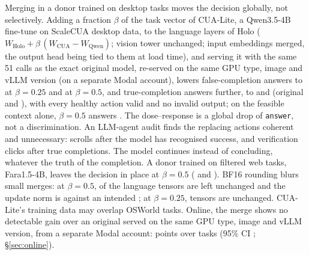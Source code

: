Merging in a donor trained on desktop tasks moves the decision globally, not selectively. Adding a fraction $\beta$ of the task vector \citep{ilharco2023task} of CUA-Lite, a Qwen3.5-4B fine-tune on ScaleCUA desktop data, to the language layers of Holo ($W_{\text{Holo}}+\beta\,(W_{\text{CUA}}-W_{\text{Qwen}})$; vision tower unchanged; input embeddings merged, the output head being tied to them at load time), and serving it with the same 51 calls as the exact original model, re-served on the same GPU type, image and vLLM version (on a separate Modal account), lowers false-completion answers to \mergeCuaQFsp{} at $\beta=0.25$ and \mergeCuaFsp{} at $\beta=0.5$, and true-completion answers further, to \mergeCuaQFsm{} and \mergeCuaFsm{} (original \mergeCuaOrigFsp{} and \mergeCuaOrigFsm), with every healthy action valid and no invalid output; on the feasible \fsp{} context alone, $\beta=0.5$ answers \infMergeCuaHalfExcl. The dose--response is a global drop of \texttt{answer}, not a discrimination. An LLM-agent audit finds the replacing actions coherent and unnecessary: scrolls after the model has recognised success, and verification clicks after true completions. The model continues instead of concluding, whatever the truth of the completion. A donor trained on filtered web tasks, Fara1.5-4B, leaves the decision in place at $\beta=0.5$ (\mergeFaraFsp{} and \mergeFaraFsm). BF16 rounding blurs small merges: at $\beta=0.5$, \mergeCuaUnchanged{} of the \mergeCuaLangTensors{} language tensors are left unchanged and the update norm is \mergeCuaActualNorm{} against an intended \mergeCuaIntendedNorm; at $\beta=0.25$, \mergeCuaQUnchanged{} tensors are unchanged. CUA-Lite's training data may overlap OSWorld tasks. %
Online, the merge shows no detectable gain over an original served on the same GPU type, image and vLLM version, from a separate Modal account: \onAllCuaDelta{} points over \onAllCuaN{} tasks (95\% CI \onAllCuaCi; \S\ref{sec:online}).

